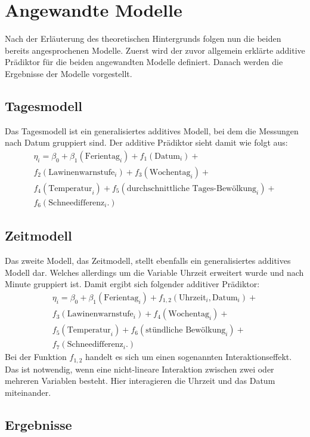 \chapter{Angewandte Modelle}
Nach der Erläuterung des theoretischen Hintergrunds folgen nun die beiden bereits angesprochenen Modelle. Zuerst wird der zuvor allgemein erklärte additive Prädiktor für die beiden angewandten Modelle definiert. Danach werden die Ergebnisse der Modelle vorgestellt.

\section{Tagesmodell}
Das Tagesmodell ist ein generalisiertes additives Modell, bei dem die Messungen nach Datum gruppiert sind. Der additive Prädiktor sieht damit wie folgt aus:
\begin{align}
\eta_{i}=\beta_{0}+\beta_{1}(\text{Ferientag}_{i})+f_{1}(\text{Datum}_{i})+ \nonumber \\
f_{2}(\text{Lawinenwarnstufe}_{i})+f_{3}(\text{Wochentag}_{i})+ \nonumber \\
f_{4}(\text{Temperatur}_{i})+f_{5}(\text{durchschnittliche Tages-Bewölkung}_{i})+  \nonumber \\
f_{6}(\text{Schneedifferenz}_{i}.)
\end{align}

\section{Zeitmodell}
Das zweite Modell, das Zeitmodell, stellt ebenfalls ein generalisiertes additives Modell dar. Welches allerdings um die Variable Uhrzeit erweitert wurde und nach Minute gruppiert ist. Damit ergibt sich folgender additiver Prädiktor:
\begin{align}
\eta_{i}=\beta_{0}+\beta_{1}(\text{Ferientag}_{i})+f_{1,2}(\text{Uhrzeit}_{i},\text{Datum}_{i})+ \nonumber \\
f_{3}(\text{Lawinenwarnstufe}_{i})+f_{4}(\text{Wochentag}_{i})+ \nonumber \\
f_{5}(\text{Temperatur}_{i})+f_{6}(\text{stündliche Bewölkung}_{i})+  \nonumber \\
f_{7}(\text{Schneedifferenz}_{i}.)
\end{align}
Bei der Funktion $f_{1,2}$ handelt es sich um einen sogenannten Interaktionseffekt. Das ist notwendig, wenn eine nicht-lineare Interaktion zwischen zwei oder mehreren Variablen besteht. Hier interagieren die Uhrzeit und das Datum miteinander.

\section{Ergebnisse}